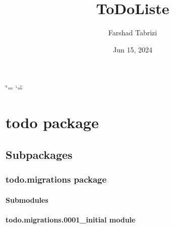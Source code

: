 \documentclass[letterpaper,10pt,english]{sphinxmanual}
\title{ToDo\sphinxhyphen{}Liste}
\date{Jun 15, 2024}
\author{Farshad Tabrizi}
\begin{document}
\ifdefined\shorthandoff
  \ifnum\catcode`\=\string=\active\shorthandoff{=}\fi
  \ifnum\catcode`\"=\active{}\fi
\fi

\pagestyle{empty}
\sphinxmaketitle
\pagestyle{plain}
\sphinxtableofcontents
\pagestyle{normal}
\label{\detokenize{index::doc}}


\sphinxstepscope


\chapter{todo package}
\label{\detokenize{todo:todo-package}}\label{\detokenize{todo::doc}}

\section{Subpackages}
\label{\detokenize{todo:subpackages}}
\sphinxstepscope


\subsection{todo.migrations package}
\label{\detokenize{todo.migrations:todo-migrations-package}}\label{\detokenize{todo.migrations::doc}}

\subsubsection{Submodules}
\label{\detokenize{todo.migrations:submodules}}

\subsubsection{todo.migrations.0001\_initial module}
\label{\detokenize{todo.migrations:module-todo.migrations.0001_initial}}\label{\detokenize{todo.migrations:todo-migrations-0001-initial-module}}
\end{document}
